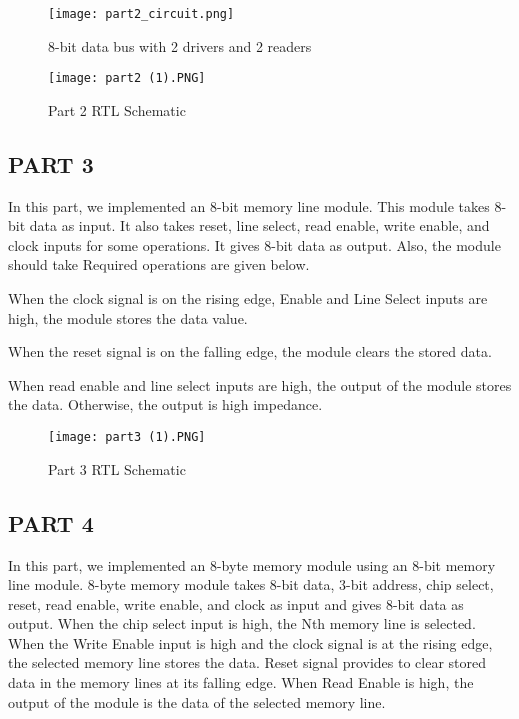 \documentclass[pdftex,12pt,a4paper]{article}
\begin{document}
\begin{figure}[hbt!]
	\centering
	\texttt{[image: part2\_circuit.png]}	
	\caption{8-bit data bus with 2 drivers and 2 readers}
	\label{fig1}
\end{figure}

\begin{figure}[hbt!]
	\centering
	\texttt{[image: part2 (1).PNG]}	
	\caption{Part 2 RTL Schematic}
	\label{fig1}
\end{figure}



\clearpage

\subsection{PART 3}
In this part, we implemented an 8-bit memory line module. This module takes 8-bit data as input. It also takes reset, line select, read enable, write enable, and clock inputs for some operations. It gives 8-bit data as output. Also, the module should take  Required operations are given below. 

When the clock signal is on the rising edge, Enable and Line Select inputs are high, the module stores the data value.

When the reset signal is on the falling edge, the module clears the stored data.

When read enable and line select inputs are high, the output of the module stores the data. Otherwise, the output is high impedance.


\begin{figure}[hbt!]
	\centering
	\texttt{[image: part3 (1).PNG]}	
	\caption{Part 3 RTL Schematic}
	\label{fig1}
\end{figure}


\clearpage

\subsection{PART 4}
In this part, we implemented an 8-byte memory module using an 8-bit memory line module. 8-byte memory module takes 8-bit data, 3-bit address, chip select, reset, read enable, write enable, and clock as input and gives 8-bit data as output.  When the chip select input is high, the Nth memory line is selected. When the Write Enable input is high and the clock signal is at the rising edge, the selected memory line stores the data. Reset signal provides to clear stored data in the memory lines at its falling edge. When Read Enable is high, the output of the module is the data of the selected memory line.
\end{document}
